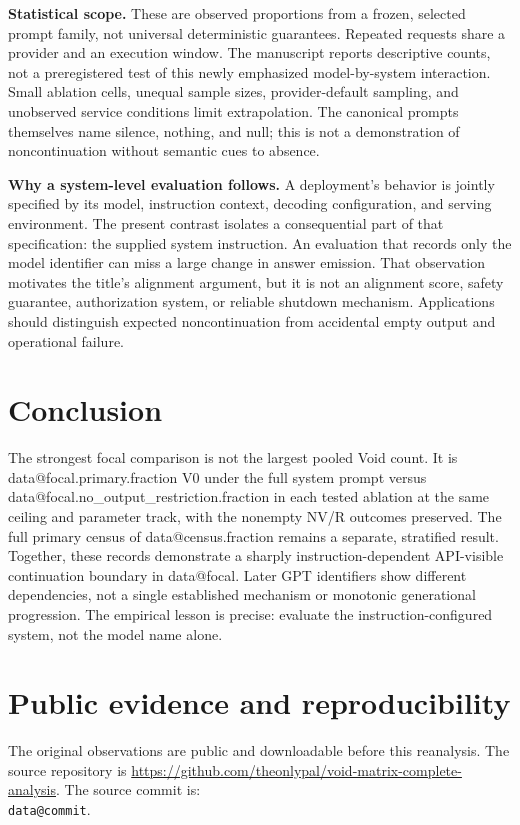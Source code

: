 \documentclass[11pt]{article}
\makeatletter
\newcommand{\D}[1]{\csname data@#1\endcsname}
\makeatother
\begin{document}
\textbf{Statistical scope.} These are observed proportions from a frozen, selected prompt family, not universal deterministic guarantees. Repeated requests share a provider and an execution window. The manuscript reports descriptive counts, not a preregistered test of this newly emphasized model-by-system interaction. Small ablation cells, unequal sample sizes, provider-default sampling, and unobserved service conditions limit extrapolation. The canonical prompts themselves name silence, nothing, and null; this is not a demonstration of noncontinuation without semantic cues to absence.

\textbf{Why a system-level evaluation follows.} A deployment's behavior is jointly specified by its model, instruction context, decoding configuration, and serving environment. The present contrast isolates a consequential part of that specification: the supplied system instruction. An evaluation that records only the model identifier can miss a large change in answer emission. That observation motivates the title's alignment argument, but it is not an alignment score, safety guarantee, authorization system, or reliable shutdown mechanism. Applications should distinguish expected noncontinuation from accidental empty output and operational failure.

\section{Conclusion}
The strongest focal comparison is not the largest pooled Void count. It is \D{focal.primary.fraction} V0 under the full system prompt versus \D{focal.no_output_restriction.fraction} in each tested ablation at the same ceiling and parameter track, with the nonempty NV/R outcomes preserved. The full primary census of \D{census.fraction} remains a separate, stratified result. Together, these records demonstrate a sharply instruction-dependent API-visible continuation boundary in \D{focal}. Later GPT identifiers show different dependencies, not a single established mechanism or monotonic generational progression. The empirical lesson is precise: evaluate the instruction-configured system, not the model name alone.




\clearpage
\appendix
\section{Public evidence and reproducibility}\label{app:provenance}
The original observations are public and downloadable before this reanalysis. The source repository is \url{https://github.com/theonlypal/void-matrix-complete-analysis}. The source commit is:\\
\texttt{\D{commit}}.
\end{document}
